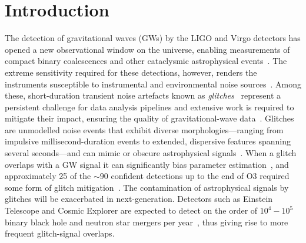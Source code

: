 \documentclass[reprint,nofootinbib,amsmath,amssymb,aps,floatfix]{revtex4-2}
\begin{document}
\maketitle


\section{Introduction}

The detection of gravitational waves (GWs) by the LIGO \cite{LIGO_paper} and Virgo \cite{VIRGOpaper} detectors has opened a new observational window on the universe, enabling measurements of compact binary coalescences and other cataclysmic astrophysical events~\cite{GWTC_3_catalog}.
The extreme sensitivity required for these detections, however, renders the instruments susceptible to instrumental and environmental noise sources~\cite{LIGO_O3_detector_characterization}.
Among these, short-duration transient noise artefacts known as \textit{glitches}~\cite{LIGO_second_third_detchar, Virgo_detchar_O3, Kagra_detchara} represent a persistent challenge for data analysis pipelines and extensive work is required to mitigate their impact, ensuring the quality of gravitational-wave data~\cite{davis2026rapiddataqualityinvestigations}.
Glitches are unmodelled noise events that exhibit diverse morphologies---ranging from impulsive millisecond-duration events to extended, dispersive features spanning several seconds---and can mimic or obscure astrophysical signals~\cite{abbott2018effects, blackburn2008lsc, abbott2016characterization}.
When a glitch overlaps with a GW signal it can significantly bias parameter estimation~\cite{pankow2018mitigation, PE_glitch_1, PE_glitch_2}, and approximately 25 of the $\sim\!90$ confident detections up to the end of O3 required some form of glitch mitigation~\cite{GWTC_3_catalog, pankow2018mitigation, BNS_1, BNS_2, BNS_BBH_2}.
The contamination of astrophysical signals by glitches will be exacerbated in next-generation. Detectors such as Einstein Telescope \cite{ET_paper} and Cosmic Explorer \cite{Cosmic_expl} are expected to detect on the order of $10^4-10^5$ binary black hole and neutron star mergers per year~\cite{Iacovelli_2022, Kalogera_BNS}, thus giving rise to more frequent glitch-signal overlaps.
\end{document}
